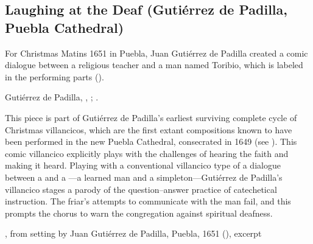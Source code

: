 \subsection{Laughing at the Deaf (Gutiérrez de Padilla, Puebla Cathedral)}

For Christmas Matins 1651 in Puebla, Juan Gutiérrez de Padilla created a comic
dialogue between a religious teacher and a  man named Toribio,
which is labeled  in the performing parts 
().%
\begin{Footnote}
    Gutiérrez de Padilla, ,
    ; 
    \autocites{Stanford:Catalog}{Puebla:Microfilm}.
\end{Footnote}
This piece is part of Gutiérrez de Padilla's earliest surviving complete cycle
of Christmas villancicos, which are the first extant compositions known to have
been performed in the new Puebla Cathedral, consecrated in 1649 (see
).
This comic  villancico explicitly plays with the challenges of
hearing the faith and making it heard.
Playing with a conventional villancico type of a dialogue between a
 and a ---a learned man and a
simpleton---Gutiérrez de Padilla's villancico stages a parody of the
question--answer practice of catechetical instruction.
The friar's attempts to communicate with the  man fail, and this
prompts the chorus to warn the congregation against spiritual deafness.


{, from setting by Juan Gutiérrez de Padilla,
Puebla, 1651 (), excerpt}

